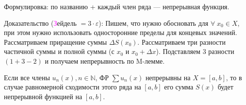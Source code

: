 \begin{col-answer-preambule}
  \begin{plan}
  	\item Формулировка: по названию + каждый член ряда — непрерывная функция.
  	\item Доказательство (\textcolor{magenta}{З}ейдель $= 3 \cdot \varepsilon$):
    \subitem Пишем, что нужно обосновать для $\forall \; x_0 \in X$, при этом нужно использовать односторонние пределы для концевых значений.
    \subitem Рассматриваем приращение суммы $\Delta S(x_0)$.
    \subitem Рассматриваем три разности частичной суммы и полной суммы (с $x_0$ и $x_0 + \Delta x$).
    \subitem Подставляем $3$ разности $(1 + 3 - 2)$ и получаем непрерывность по M-лемме.
  \end{plan}
\end{col-answer-preambule}
\begin{theorem}
	Если все члены $u_n(x), n \in \mathbb{N}$, ФР $\sum u_n(x)$ непрерывны на $X = [a,b]$, то в случае равномерной сходимости этого ряда на $[a,b]$ его сумма $S(x)$ будет непрерывной функцией на $[a,b]$.
\end{theorem}
